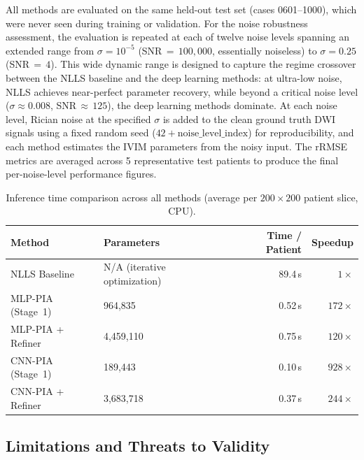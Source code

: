\documentclass[12pt]{article}
\begin{document}
All methods are evaluated on the same held-out test set (cases 0601--1000), which were never seen during training or validation. For the noise robustness assessment, the evaluation is repeated at each of twelve noise levels spanning an extended range from $\sigma = 10^{-5}$ (SNR$\,=\,100{,}000$, essentially noiseless) to $\sigma = 0.25$ (SNR$\,=\,4$). This wide dynamic range is designed to capture the regime crossover between the NLLS baseline and the deep learning methods: at ultra-low noise, NLLS achieves near-perfect parameter recovery, while beyond a critical noise level ($\sigma \approx 0.008$, SNR$\,\approx\,125$), the deep learning methods dominate. At each noise level, Rician noise at the specified $\sigma$ is added to the clean ground truth DWI signals using a fixed random seed ($42 + \text{noise\_level\_index}$) for reproducibility, and each method estimates the IVIM parameters from the noisy input. The rRMSE metrics are averaged across 5 representative test patients to produce the final per-noise-level performance figures.

\begin{table}[h]
\centering
\caption{Inference time comparison across all methods (average per $200{\times}200$ patient slice, CPU).}
\label{tab:inference_timing}
\begin{tabular}{llrr}
\toprule
\textbf{Method} & \textbf{Parameters} & \textbf{Time / Patient} & \textbf{Speedup} \\
\midrule
NLLS Baseline       & N/A (iterative optimization)           & 89.4\,s  & $1{\times}$ \\
MLP-PIA (Stage~1)   & 964,835                                & 0.52\,s  & $172{\times}$ \\
MLP-PIA + Refiner   & 4,459,110                              & 0.75\,s  & $120{\times}$ \\
CNN-PIA (Stage~1)   & 189,443                                & 0.10\,s  & $928{\times}$ \\
CNN-PIA + Refiner   & 3,683,718                              & 0.37\,s  & $244{\times}$ \\
\bottomrule
\end{tabular}
\end{table}

\subsection{Limitations and Threats to Validity}
\end{document}
